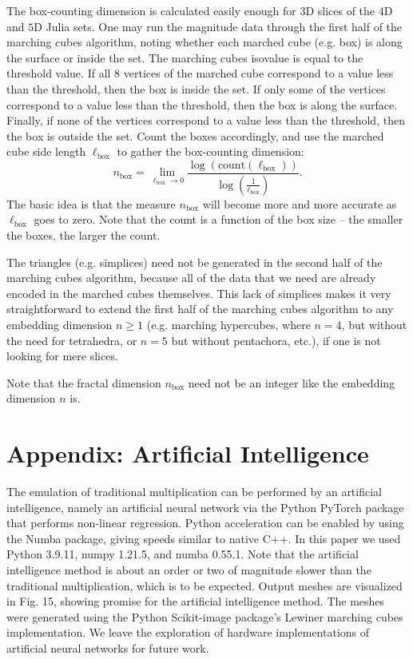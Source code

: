 \documentclass[12pt]{article}
\begin{document}
The box-counting dimension is calculated easily enough for $3$D slices of the $4$D and $5$D Julia sets.
One may run the magnitude data through the first half of the marching cubes algorithm, noting whether each marched cube (e.g. box) is along the surface or inside the set.
The marching cubes isovalue is equal to the threshold value.
If all 8 vertices of the marched cube correspond to a value less than the threshold, then the box is inside the set.
If only some of the vertices correspond to a value less than the threshold, then the box is along the surface.
Finally, if none of the vertices correspond to a value less than the threshold, then the box is outside the set.
Count the boxes accordingly, and use the marched cube side length $\ell_{\textrm{box}}$ to gather the box-counting dimension:
\begin{equation}
n_{\textrm{box}} = \lim_{\ell_{\textrm{box}} \to 0} \frac{ \log({\textrm{count}}(\ell_{\textrm{box}}))  }{\log\left(\frac{1}{\ell_{\textrm{box}}}\right)}.
\end{equation}
The basic idea is that the measure $n_{\textrm{box}}$ will become more and more accurate as $\ell_{\textrm{box}}$ goes to zero.
Note that the count is a function of the box size -- the smaller the boxes, the larger the count.

The triangles (e.g. simplices) need not be generated in the second half of the marching cubes algorithm, because all of the data that we need are already encoded in the marched cubes themselves.
This lack of simplices makes it very straightforward to extend the first half of the marching cubes algorithm to any embedding dimension $n \geq 1$ (e.g. marching hypercubes, where $n = 4$, but without the need for tetrahedra, or $n = 5$ but without pentachora, etc.), if one is not looking for mere slices.

Note that the fractal dimension $n_{\textrm{box}}$ need not be an integer like the embedding dimension $n$ is.


\section{Appendix: Artificial Intelligence}

The emulation of traditional multiplication can be performed by an artificial intelligence, namely an artificial neural network via the Python PyTorch package that performs non-linear regression.
Python acceleration can be enabled by using the Numba package, giving speeds similar to native C++.
In this paper we used Python 3.9.11, numpy 1.21.5, and numba 0.55.1.
Note that the artificial intelligence method is about an order or two of magnitude slower than the traditional multiplication, which is to be expected.
Output meshes are visualized in Fig. 15, showing promise for the artificial intelligence method.
The meshes were generated using the Python Scikit-image package's Lewiner marching cubes implementation.
We leave the exploration of hardware implementations of artificial neural networks for future work.
\end{document}
